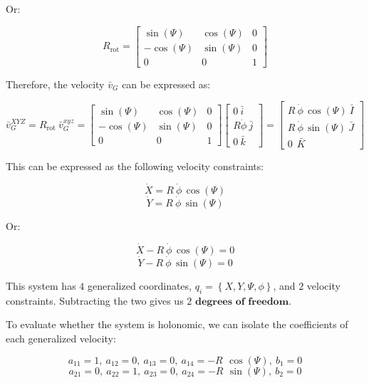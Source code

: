 \documentclass[12pt, letterpaper]{../assignment}
\begin{document}
Or:

$$  R_\text{rot} = 
\left[\begin{array}{ccc} \sin\left(\Psi \right) & \cos\left(\Psi \right) & 0\\ -\cos\left(\Psi \right) & \sin\left(\Psi \right) & 0\\ 0 & 0 & 1 \end{array}\right] $$

Therefore, the velocity $\bar{v}_G$ can be expressed as:

$$ \bar{v}_G^{XYZ} = R_\text{rot}\ \bar{v}_G^{xyz} = 
\left[\begin{array}{ccc} \sin\left(\Psi \right) & \cos\left(\Psi \right) & 0\\ -\cos\left(\Psi \right) & \sin\left(\Psi \right) & 0\\ 0 & 0 & 1 \end{array}\right]
\left[\begin{array}{r} 0 \ \bar{i}\\ R \dot{\phi}\ \bar{j}\\ 0 \ \bar{k} \end{array}\right]
= \left[\begin{array}{r} R\ \dot{\phi} \,\cos\left(\Psi \right)\ \bar{I}\\ R\ \dot{\phi}\,\sin\left(\Psi \right)\ \bar{J}\\ 0\ \ \bar{K} \end{array}\right]$$

This can be expressed as the following velocity constraints:

\begin{answer}
$$ \dot{X} = R\ \dot{\phi}\,\cos\left(\Psi \right) $$
$$ \dot{Y} = R\ \dot{\phi}\,\sin\left(\Psi \right) $$
\end{answer}

Or: 

 $$ \dot{X} -R\ \dot{\phi}\,\cos\left(\Psi \right) = 0 $$
$$ \dot{Y} - R\ \dot{\phi}\,\sin\left(\Psi \right) = 0 $$

\begin{answer}
This system has $4$ generalized coordinates, $q_i = \left\{X, Y, \Psi, \phi\right\}$, and $2$ velocity constraints.
Subtracting the two gives us $2 \textbf{ degrees of freedom}.$
\end{answer}

To evaluate whether the system is holonomic,
we can isolate the coefficients of each generalized velocity:

$$ a_{11} = 1,\ a_{12} = 0,\ a_{13} = 0,\ a_{14} = -R\ \,\cos\left(\Psi\right), \ b_1 = 0 $$
$$ a_{21} = 0,\ a_{22} = 1,\ a_{23} = 0,\ a_{24} = -R\ \,\sin\left(\Psi\right), \ b_2 = 0 $$
\end{document}
